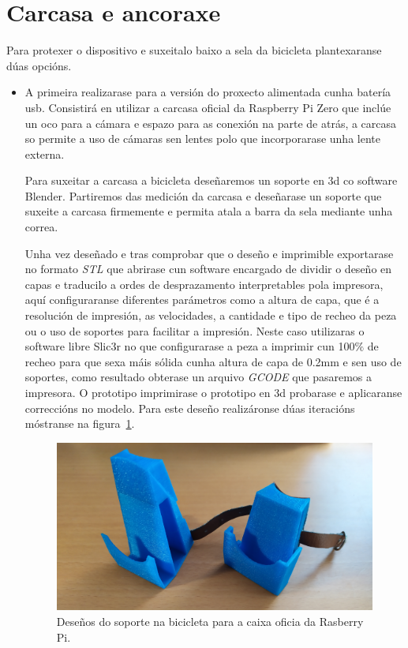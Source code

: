 \section{Carcasa e ancoraxe}

Para protexer o dispositivo e suxeitalo baixo a sela da bicicleta plantexaranse dúas opcións.
\begin{itemize}
    \item A primeira realizarase para a versión do proxecto alimentada cunha batería usb. Consistirá en utilizar a carcasa oficial da Raspberry Pi Zero que inclúe un oco para a cámara e espazo para as conexión na parte de atrás, a carcasa so permite a uso de cámaras sen lentes polo que incorporarase unha lente externa.

    Para suxeitar a carcasa a bicicleta deseñaremos un soporte en 3d co software Blender. Partiremos das medición da carcasa e deseñarase un soporte que suxeite a carcasa firmemente e permita atala a barra da sela mediante unha correa.

    Unha vez deseñado e tras comprobar que o deseño e imprimible exportarase no formato \emph{STL} que abrirase cun software encargado de dividir o deseño en capas e traducilo a ordes de desprazamento interpretables pola impresora, aquí configuraranse diferentes parámetros como a altura de capa, que é a resolución de impresión, as velocidades, a cantidade e tipo de recheo da peza ou o uso de soportes para facilitar a impresión. Neste caso utilizaras o software libre Slic3r no que configurarase a peza a imprimir cun 100\(\%\) de recheo para que sexa máis sólida cunha altura de capa de 0.2mm e sen uso de soportes, como resultado obterase un arquivo \emph{GCODE}  que pasaremos a impresora. O prototipo imprimirase o prototipo en 3d probarase e aplicaranse correccións no modelo. Para este deseño realizáronse dúas iteracións móstranse na figura~\ref{fig:soporte_caixa}.

    \begin{figure}[tb]
      \centering
      \includegraphics[scale=.1]{imaxes/soporte-caixa.jpg}
      \caption{Deseños do soporte na bicicleta para a caixa oficia da Rasberry Pi.}
      \label{fig:soporte_caixa}
    \end{figure}



\end{itemize}
